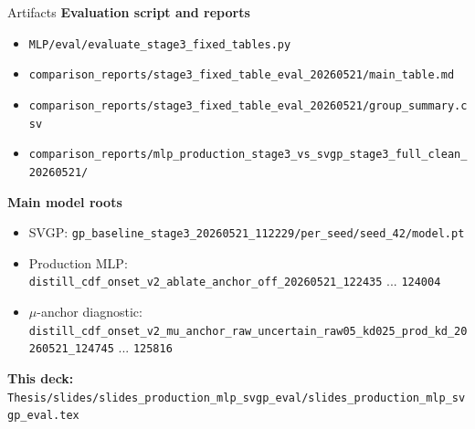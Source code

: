 \documentclass[UTF8,aspectratio=169]{ctexbeamer}
\begin{document}
\begin{frame}{Artifacts}
\footnotesize
\textbf{Evaluation script and reports}
\begin{itemize}\setlength\itemsep{2pt}
  \item \texttt{MLP/eval/evaluate\_stage3\_fixed\_tables.py}
  \item \texttt{comparison\_reports/stage3\_fixed\_table\_eval\_20260521/main\_table.md}
  \item \texttt{comparison\_reports/stage3\_fixed\_table\_eval\_20260521/group\_summary.csv}
  \item \texttt{comparison\_reports/mlp\_production\_stage3\_vs\_svgp\_stage3\_full\_clean\_20260521/}
\end{itemize}

\vspace{0.25em}
\textbf{Main model roots}
\begin{itemize}\setlength\itemsep{2pt}
  \item SVGP: \texttt{gp\_baseline\_stage3\_20260521\_112229/per\_seed/seed\_42/model.pt}
  \item Production MLP: \texttt{distill\_cdf\_onset\_v2\_ablate\_anchor\_off\_20260521\_122435} ... \texttt{124004}
  \item \(\mu\)-anchor diagnostic: \texttt{distill\_cdf\_onset\_v2\_mu\_anchor\_raw\_uncertain\_raw05\_kd025\_prod\_kd\_20260521\_124745} ... \texttt{125816}
\end{itemize}

\vspace{0.25em}
\textbf{This deck:}\\
\texttt{Thesis/slides/slides\_production\_mlp\_svgp\_eval/slides\_production\_mlp\_svgp\_eval.tex}
\end{frame}
\end{document}

